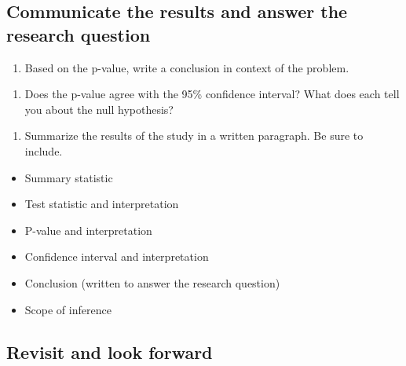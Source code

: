 \documentclass[
]{report}
\providecommand{\tightlist}{%
  \setlength{\itemsep}{0pt}\setlength{\parskip}{0pt}}
\begin{document}
\hypertarget{communicate-the-results-and-answer-the-research-question}{%
\subsection*{Communicate the results and answer the research question}\label{communicate-the-results-and-answer-the-research-question}}

\begin{enumerate}
\def\labelenumi{\arabic{enumi}.}
\setcounter{enumi}{16}
\tightlist
\item
  Based on the p-value, write a conclusion in context of the problem.
\end{enumerate}

\vspace{1in}

\begin{enumerate}
\def\labelenumi{\arabic{enumi}.}
\setcounter{enumi}{17}
\tightlist
\item
  Does the p-value agree with the 95\% confidence interval? What does each tell you about the null hypothesis?
\end{enumerate}

\vspace{1in}

\begin{enumerate}
\def\labelenumi{\arabic{enumi}.}
\setcounter{enumi}{18}
\tightlist
\item
  Summarize the results of the study in a written paragraph. Be sure to include.
\end{enumerate}

\begin{itemize}
\item
  Summary statistic
\item
  Test statistic and interpretation
\item
  P-value and interpretation
\item
  Confidence interval and interpretation
\item
  Conclusion (written to answer the research question)
\item
  Scope of inference
\end{itemize}

\vspace{3in}

\hypertarget{revisit-and-look-forward}{%
\subsection*{Revisit and look forward}\label{revisit-and-look-forward}}
\end{document}
